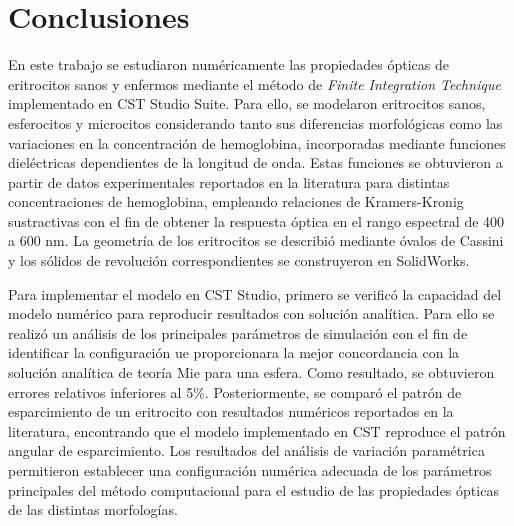 \chapter*{Conclusiones}
\label{chapter:concl}

En este trabajo se estudiaron numéricamente las propiedades ópticas de eritrocitos sanos y enfermos mediante el método de \textit{Finite Integration Technique} implementado en CST Studio Suite. Para ello, se modelaron eritrocitos sanos, esferocitos y microcitos considerando tanto sus diferencias morfológicas como las variaciones en la concentración de hemoglobina, incorporadas mediante funciones dieléctricas dependientes de la longitud de onda. Estas funciones se obtuvieron a partir de datos experimentales reportados en la literatura para distintas concentraciones de hemoglobina, empleando relaciones de Kramers-Kronig sustractivas con el fin de obtener la respuesta óptica en el rango espectral de 400 a 600 nm. La geometría de los eritrocitos se describió mediante óvalos de Cassini y los sólidos de revolución correspondientes se construyeron en SolidWorks.

Para implementar el modelo en CST Studio, primero se verificó la capacidad del modelo numérico para reproducir resultados con solución analítica. Para ello se realizó un análisis de los principales parámetros de simulación con el fin de identificar la configuración 	ue proporcionara la mejor concordancia con la solución analítica de teoría Mie para una esfera. Como resultado, se obtuvieron errores relativos inferiores al 5\%. Posteriormente, se comparó el patrón de esparcimiento de un eritrocito con resultados numéricos reportados en la literatura, encontrando que el modelo implementado en CST reproduce el patrón angular de esparcimiento. Los resultados del análisis de variación paramétrica permitieron establecer una configuración numérica adecuada de los parámetros principales del método computacional para el estudio de las propiedades ópticas de las distintas morfologías.

